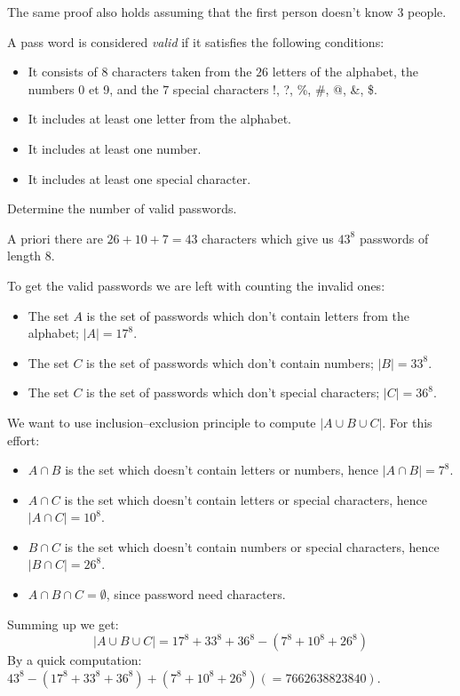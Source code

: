 \documentclass[a4paper,11pt]{exam}
\begin{document}
\begin{questions}
\begin{solution}
			The same proof also holds assuming that the first person doesn't know 3 people.
			
		\end{solution}
		
		\question
		A  pass word is considered \emph{valid} if it satisfies the following conditions:
		\begin{itemize}
			\item It consists of $8$ characters taken from the $26$ letters
			of the alphabet, the numbers 0 et 9, and the $7$
			special characters !, ?, \%, \#, @, \&, \$.
			\item It includes at least one letter from the alphabet.
			\item It includes at least one number.
			\item It includes at least one special character.
		\end{itemize}
		Determine the number of valid passwords.
		
		\begin{solution}
			A priori there are $26 + 10 + 7 = 43$ characters which give us $43^8$ passwords of length 8.
			
			To get the valid passwords we are left with counting the invalid ones:
			\begin{itemize}
				\item The set $A$ is the set of passwords which don't contain letters from the alphabet; $|A| = 17^8$.
				\item  The set $C$ is the set of passwords which don't contain numbers; $|B| = 33^8$.
				\item  The set $C$ is the set of passwords which don't special characters; $|C| = 36^8$.
			\end{itemize}
			We want to use inclusion–exclusion principle to compute $|A \cup B \cup C|$. For this effort:
			\begin{itemize}
				\item $A \cap B$ is the set which doesn't contain letters  or numbers, hence $|A \cap B| = 7^8$.
				\item $A \cap C$ is the set which doesn't contain letters  or special characters, hence $|A \cap C| = 10^8$.
				\item $B \cap C$ is the set which doesn't contain numbers  or special characters, hence $|B \cap C| = 26^8$.
				\item $A \cap B \cap C = \emptyset$, since password need characters.
			\end{itemize}
			Summing up we get: \[|A \cup B \cup C| = 17^8 +33^8 +36^8 −(7^8 +10^8 +26^8)\]
			By a quick computation:
			$43^8 −(17^8 +33^8 +36^8 )+(7^8 +10^8 +26^8 )(=7662638823840)$.
		\end{solution}
		

\end{questions}
\end{document}
